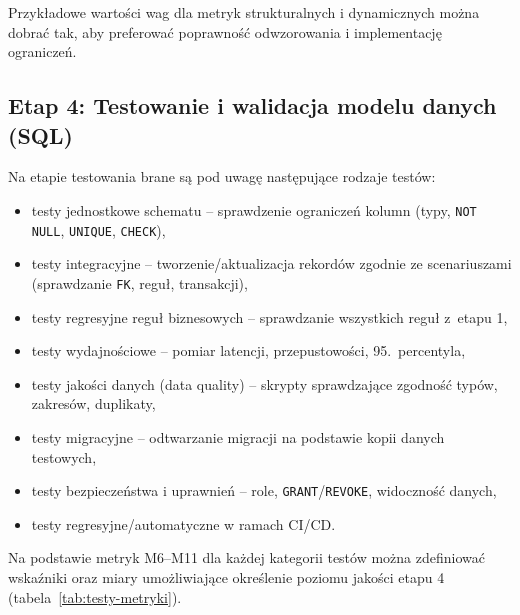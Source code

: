 Przykładowe wartości wag dla metryk strukturalnych i dynamicznych można dobrać tak, aby preferować poprawność odwzorowania i implementację ograniczeń.

\subsection*{Etap 4: Testowanie i walidacja modelu danych (SQL)}

Na etapie testowania brane są pod uwagę następujące rodzaje testów:
\begin{itemize}
  \item testy jednostkowe schematu -- sprawdzenie ograniczeń kolumn (typy, \texttt{NOT NULL}, \texttt{UNIQUE}, \texttt{CHECK}),
  \item testy integracyjne -- tworzenie/aktualizacja rekordów zgodnie ze scenariuszami (sprawdzanie \texttt{FK}, reguł, transakcji),
  \item testy regresyjne reguł biznesowych -- sprawdzanie wszystkich reguł z~etapu 1,
  \item testy wydajnościowe -- pomiar latencji, przepustowości, 95.\ percentyla,
  \item testy jakości danych (data quality) -- skrypty sprawdzające zgodność typów, zakresów, duplikaty,
  \item testy migracyjne -- odtwarzanie migracji na podstawie kopii danych testowych,
  \item testy bezpieczeństwa i uprawnień -- role, \texttt{GRANT}/\texttt{REVOKE}, widoczność danych,
  \item testy regresyjne/automatyczne w ramach CI/CD.
\end{itemize}

Na podstawie metryk M6--M11 dla każdej kategorii testów można zdefiniować wskaźniki oraz miary umożliwiające określenie poziomu jakości etapu 4 (tabela~\ref{tab:testy-metryki}).

